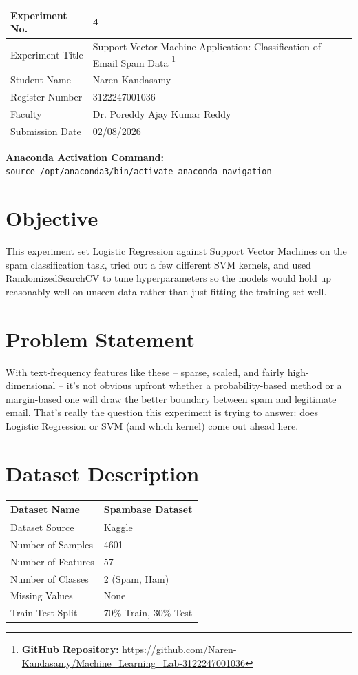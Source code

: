 \documentclass[12pt,a4paper]{article}
\begin{document}
\begin{tabular}{|p{4cm}|p{11cm}|}
\hline
Experiment No. & 4 \\ \hline
Experiment Title & Support Vector Machine Application: Classification of Email Spam Data
\footnote{\textbf{GitHub Repository: }\url{https://github.com/Naren-Kandasamy/Machine_Learning_Lab-3122247001036}}\\ \hline
Student Name & Naren Kandasamy \\ \hline
Register Number & 3122247001036 \\ \hline
Faculty & Dr. Poreddy Ajay Kumar Reddy \\ \hline
Submission Date & 02/08/2026 \\ \hline
\end{tabular}

\vspace{0.5cm}
\noindent\textbf{Anaconda Activation Command:} \\
\texttt{source /opt/anaconda3/bin/activate anaconda-navigation}

\section{Objective}
This experiment set Logistic Regression against Support Vector Machines on the spam classification task, tried out a few different SVM kernels, and used RandomizedSearchCV to tune hyperparameters so the models would hold up reasonably well on unseen data rather than just fitting the training set well.

\section{Problem Statement}
With text-frequency features like these -- sparse, scaled, and fairly high-dimensional -- it's not obvious upfront whether a probability-based method or a margin-based one will draw the better boundary between spam and legitimate email. That's really the question this experiment is trying to answer: does Logistic Regression or SVM (and which kernel) come out ahead here.

\section{Dataset Description}
\begin{longtable}{|p{6cm}|p{8cm}|}
\hline
Dataset Name & Spambase Dataset \\ \hline
Dataset Source & Kaggle \\ \hline
Number of Samples & 4601 \\ \hline
Number of Features & 57 \\ \hline
Number of Classes & 2 (Spam, Ham) \\ \hline
Missing Values & None \\ \hline
Train-Test Split & 70\% Train, 30\% Test \\ \hline
\end{longtable}
\end{document}
